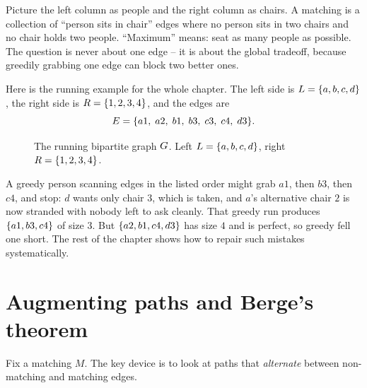 \begin{intuitionbox}
Picture the left column as people and the right column as chairs. A matching is a
collection of ``person sits in chair'' edges where no person sits in two chairs and
no chair holds two people. ``Maximum'' means: seat as many people as possible. The
question is never about one edge -- it is about the global tradeoff, because
greedily grabbing one edge can block two better ones.
\end{intuitionbox}

Here is the running example for the whole chapter. The left side is
$L=\{a,b,c,d\}$, the right side is $R=\{1,2,3,4\}$, and the edges are
\[
E=\{a1,\;a2,\;b1,\;b3,\;c3,\;c4,\;d3\}.
\]

\begin{figure}[H]
\centering
{}
\caption{The running bipartite graph $G$. Left $L=\{a,b,c,d\}$, right
$R=\{1,2,3,4\}$.}
\label{ch15:fig-running}
\end{figure}

A greedy person scanning edges in the listed order might grab $a1$, then $b3$,
then $c4$, and stop: $d$ wants only chair $3$, which is taken, and $a$'s
alternative chair $2$ is now stranded with nobody left to ask cleanly. That
greedy run produces $\{a1,b3,c4\}$ of size $3$. But $\{a2,b1,c4,d3\}$ has
size $4$ and is perfect, so greedy fell one short. The rest of the chapter shows
how to repair such mistakes systematically.

\section{Augmenting paths and Berge's theorem}
\label{ch15:berge}

Fix a matching $M$. The key device is to look at paths that \emph{alternate}
between non-matching and matching edges.

